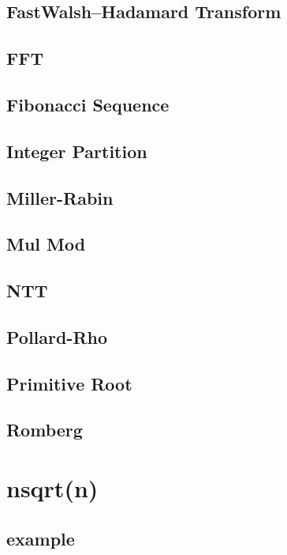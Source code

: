 \documentclass[twocolumn]{article}
\begin{document}
\subsection{FastWalsh–Hadamard Transform}

\subsection{FFT}

\subsection{Fibonacci Sequence}

\subsection{Integer Partition}

\subsection{Miller-Rabin}

\subsection{Mul Mod}

\subsection{NTT}

\subsection{Pollard-Rho}

\subsection{Primitive Root}

\subsection{Romberg}

\section{nsqrt(n)}
\subsection{example}

\end{document}

